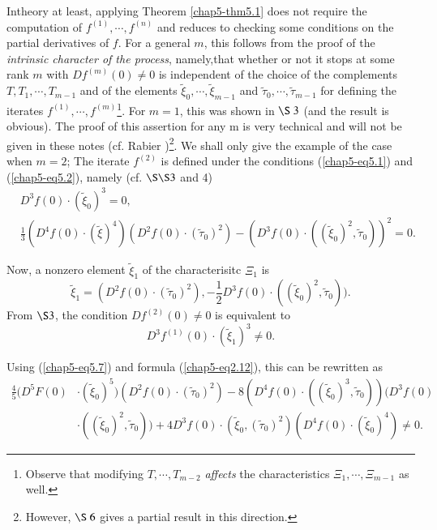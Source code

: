 \begin{remark}\label{chap5-rem5.1}
In\pageoriginale theory at least, applying Theorem \ref{chap5-thm5.1} does not require the computation of $f^{(1)}, \cdots, f^{(n)}$ and reduces to checking some conditions on the partial derivatives of $f$. For a general $m$, this follows from the proof of the {\em intrinsic character of the process}, namely,\pageoriginale that whether or not it stops at some rank $m$ with $Df^{(m)}(0) \neq 0$ is independent of the choice of the complements $T, T_{1}, \cdots, T_{m-1}$ and of the elements $\widetilde{\xi}_{0}, \cdots , \widetilde{\xi}_{m-1}$ and $\widetilde{\tau}_{0}, \cdots ,\widetilde{\tau}_{m-1}$ for defining the iterates $f^{(1)}, \cdots, f^{(m)}$\footnote{Observe that modifying $T, \cdots , T_{m-2}$ {\em affects} the characteristics $\Xi_{1}, \cdots , \Xi_{m-1}$ as well.}. For $m = 1$, this was shown in $\S\ 3$ (and the result is obvious). The proof of this assertion for any m is very technical and will not be given in these notes (cf. Rabier \cite{32})\footnote{However, $\S\ 6$ gives a partial result in this direction.}. We shall only give the example of the case when $m = 2$; The iterate $f^{(2)}$ is defined under the conditions (\ref{chap5-eq5.1}) and (\ref{chap5-eq5.2}), namely (cf. $\S\S 3$ and 4)
\begin{align*}
& D^{3}f(0) \cdot (\widetilde{\xi}_{0})^{3} = 0,\tag{5.6}\label{chap5-eq5.6}\\
& \frac{1}{3} (D^{4}f(0) \cdot (\widetilde{\xi})^{4}) (D^{2}f(0) \cdot (\widetilde{\tau}_{0})^{2}) - (D^{3}f(0) \cdot ((\widetilde{\xi}_{0})^{2}, \widetilde{\tau}_{0}))^{2} = 0.\tag{5.7}\label{chap5-eq5.7}  
\end{align*}

Now, a nonzero element $\widetilde{\xi}_{1}$ of the characterisitc $\Xi_{1}$ is
$$
\widetilde{\xi}_{1} = (D^{2}f(0) \cdot (\widetilde{\tau}_{0})^{2}), - \frac{1}{2} D^{3}f(0) \cdot ((\widetilde{\xi}_{0})^{2}, \widetilde{\tau}_{0})).
$$
From $\S 3$, the condition $Df^{(2)}(0) \neq 0$ is equivalent to
$$
D^{3}f^{(1)}(0) \cdot (\widetilde{\xi}_{1})^{3} \neq 0.
$$

Using (\ref{chap5-eq5.7}) and formula (\ref{chap5-eq2.12}), this can be rewritten as
\begin{align*}
\frac{4}{5} (D^{5}F(0) &\cdot(\widetilde{\xi}_{0})^{5}) (D^{2}f(0)
  \cdot (\widetilde{\tau}_{0})^{2}) - 8(D^{4}f(0)
  \cdot((\widetilde{\xi}_{0})^{3}, \widetilde{\tau}_{0}))(D^{3}f(0)\\ 
&\cdot ((\widetilde{\xi}_{0})^{2}, \widetilde{\tau}_{0})) + 4D^{3}f(0) \cdot (\widetilde{\xi}_{0}, (\widetilde{\tau}_{0})^{2})
(D^{4}f(0) \cdot (\widetilde{\xi}_{0})^{4}) \neq 0.\tag{5.8}\label{chap5-eq5.8}
\end{align*}
\end{remark}

